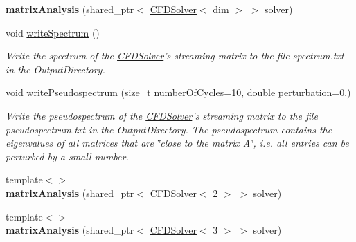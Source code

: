 \begin{DoxyCompactItemize}
\item 
\hypertarget{classnatrium_1_1matrixAnalysis_ab1434eb6a7256560cbeaf2f3869709ed}{{\bfseries matrix\-Analysis} (shared\-\_\-ptr$<$ \hyperlink{classnatrium_1_1CFDSolver}{C\-F\-D\-Solver}$<$ dim $>$ $>$ solver)}\label{classnatrium_1_1matrixAnalysis_ab1434eb6a7256560cbeaf2f3869709ed}

\item 
void \hyperlink{classnatrium_1_1matrixAnalysis_af83535a0c1c83db223649b958c245df1}{write\-Spectrum} ()
\begin{DoxyCompactList}\small\item\em Write the spectrum of the \hyperlink{classnatrium_1_1CFDSolver}{C\-F\-D\-Solver}'s streaming matrix to the file spectrum.\-txt in the Output\-Directory. \end{DoxyCompactList}\item 
void \hyperlink{classnatrium_1_1matrixAnalysis_a2c18eb04461c90bfdf3f301e8c9dfc1b}{write\-Pseudospectrum} (size\-\_\-t number\-Of\-Cycles=10, double perturbation=0.)
\begin{DoxyCompactList}\small\item\em Write the pseudospectrum of the \hyperlink{classnatrium_1_1CFDSolver}{C\-F\-D\-Solver}'s streaming matrix to the file pseudospectrum.\-txt in the Output\-Directory. The pseudospectrum contains the eigenvalues of all matrices that are \char`\"{}close to the matrix A\char`\"{}, i.\-e. all entries can be perturbed by a small number. \end{DoxyCompactList}\item 
\hypertarget{classnatrium_1_1matrixAnalysis_af859304140aa0d5e5429bacdd6341d3e}{{\footnotesize template$<$$>$ }\\{\bfseries matrix\-Analysis} (shared\-\_\-ptr$<$ \hyperlink{classnatrium_1_1CFDSolver}{C\-F\-D\-Solver}$<$ 2 $>$ $>$ solver)}\label{classnatrium_1_1matrixAnalysis_af859304140aa0d5e5429bacdd6341d3e}

\item 
\hypertarget{classnatrium_1_1matrixAnalysis_a4ef4d76dd9e24c90a6844edeef6de313}{{\footnotesize template$<$$>$ }\\{\bfseries matrix\-Analysis} (shared\-\_\-ptr$<$ \hyperlink{classnatrium_1_1CFDSolver}{C\-F\-D\-Solver}$<$ 3 $>$ $>$ solver)}\label{classnatrium_1_1matrixAnalysis_a4ef4d76dd9e24c90a6844edeef6de313}

\end{DoxyCompactItemize}
